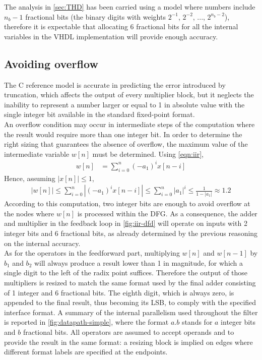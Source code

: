 The analysis in \autoref{sec:THD} has been carried using a model where numbers include $n_b-1$ fractional bits (the binary digits with weights $2^{-1}$, $2^{-2}$, ..., $2^{n_b-2}$), therefore it is expectable that allocating 6 fractional bits for all the internal variables in the VHDL implementation will provide enough accuracy.

\subsection{Avoiding overflow}
The C reference model is accurate in predicting the error introduced by truncation, which affects the output of every multiplier block, but it neglects the inability to represent a number larger or equal to 1 in absolute value with the single integer bit available in the standard fixed-point format.\\
An overflow condition may occur in intermediate steps of the computation where the result would require more than one integer bit. In order to determine the right sizing that guarantees the absence of overflow, the maximum value of the intermediate variable $w[n]$ must be determined. Using \autoref{eqn:iir},
\begin{align*}
	w[n] &= \sum_{i=0}^{n} (-a_1)^i x[n-i]
\end{align*}
Hence, assuming $|x[n]|\leq 1$,
\begin{align*}
	|w[n]|\leq
	\sum_{i=0}^{n} |(-a_1)^i x[n-i]| \leq
	\sum_{i=0}^{n} |a_1|^i \leq
	\frac{1}{1-|a_1|} \approx
	1.2
\end{align*}
According to this computation, two integer bits are enough to avoid overflow at the nodes where $w[n]$ is processed within the DFG. As a consequence, the adder and multiplier in the feedback loop in \autoref{fig:iir-dfd} will operate on inputs with 2 integer bits and 6 fractional bits, as already determined by the previous reasoning on the internal accuracy.\\
As for the operators in the feedforward part, multiplying $w[n]$ and $w[n-1]$ by $b_1$ and $b_2$ will always produce a result lower than 1 in magnitude, for which a single digit to the left of the radix point suffices. Therefore the output of those multipliers is resized to match the same format used by the final adder consisting of 1 integer and 6 fractional bits. The eighth digit, which is always zero, is appended to the final result, thus becoming its LSB, to comply with the specified interface format. A summary of the internal parallelism used throughout the filter is reported in \autoref{fig:datapath-simple}, where the format $a.b$ stands for $a$ integer bits and $b$ fractional bits. All operators are assumed to accept operands and to provide the result in the same format: a resizing block is implied on edges where different format labels are specified at the endpoints.
